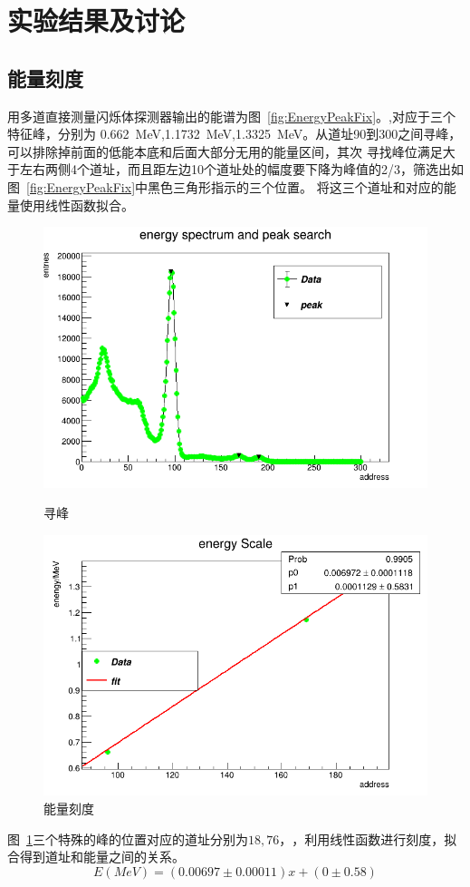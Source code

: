 \documentclass[10pt]{ctexart}
\begin{document}
\section{实验结果及讨论}
\subsection{能量刻度}
用多道直接测量闪烁体探测器输出的能谱为图~\ref{fig:EnergyPeakFix}。,对应于三个特征峰，分别为
\SI{0.662}{MeV},\SI{1.1732}{MeV},\SI{1.3325}{MeV}。从道址90到300之间寻峰，可以排除掉前面的低能本底和后面大部分无用的能量区间，其次
寻找峰位满足大于左右两侧4个道址，而且距左边10个道址处的幅度要下降为峰值的2/3，筛选出如图~\ref{fig:EnergyPeakFix}中黑色三角形指示的三个位置。
将这三个道址和对应的能量使用线性函数拟合。
\begin{figure}[htbp]
    \centering
    \begin{minipage}{0.45\textwidth}
        \centering
        \includegraphics[width=\textwidth]{data/scaleEnergy.png}
        \caption{寻峰}
        \label{fig:EnergyPeakFix}
    \end{minipage}
    \qquad
    \begin{minipage}{0.45\textwidth}
        \centering
        \includegraphics[width=\textwidth]{data/scaleEnergyFit.png}
        \caption{能量刻度}
        \label{fig:EnergyFix}
    \end{minipage}
\end{figure}
图~\ref{fig:EnergyFix}三个特殊的峰的位置对应的道址分别为$18,76，$，利用线性函数进行刻度，拟合得到道址和能量之间的关系。
\[E(MeV)=(0.00697\pm 0.00011)x+(0\pm 0.58)\]
\end{document}
